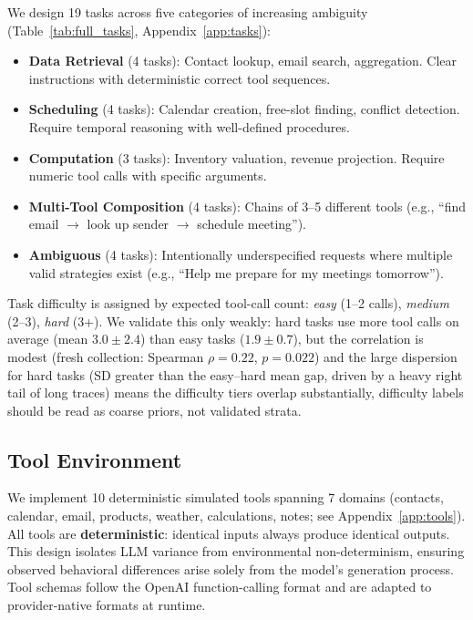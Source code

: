\documentclass[11pt]{article}
\begin{document}
We design 19 tasks across five categories of increasing ambiguity
(Table~\ref{tab:full_tasks}, Appendix~\ref{app:tasks}):

\begin{itemize}[leftmargin=1.5em]
  \item \textbf{Data Retrieval} (4 tasks): Contact lookup, email search, aggregation.
    Clear instructions with deterministic correct tool sequences.
  \item \textbf{Scheduling} (4 tasks): Calendar creation, free-slot finding, conflict
    detection. Require temporal reasoning with well-defined procedures.
  \item \textbf{Computation} (3 tasks): Inventory valuation, revenue projection.
    Require numeric tool calls with specific arguments.
  \item \textbf{Multi-Tool Composition} (4 tasks): Chains of 3--5 different tools
    (e.g., ``find email $\to$ look up sender $\to$ schedule meeting'').
  \item \textbf{Ambiguous} (4 tasks): Intentionally underspecified requests where
    multiple valid strategies exist
    (e.g., ``Help me prepare for my meetings tomorrow'').
\end{itemize}

\noindent
Task difficulty is assigned by expected tool-call count: \emph{easy} (1--2 calls),
\emph{medium} (2--3), \emph{hard} (3+). We validate this only weakly: hard tasks use more tool calls on average
(mean $3.0 \pm 2.4$) than easy tasks ($1.9 \pm 0.7$), but the correlation is
modest (fresh collection: Spearman $\rho = 0.22$, $p = 0.022$) and the large dispersion for
hard tasks (SD greater than the easy--hard mean gap, driven by a heavy right
tail of long traces) means the difficulty tiers overlap substantially,
difficulty labels should be read as coarse priors, not validated strata.

\subsection{Tool Environment}

We implement 10 deterministic simulated tools spanning 7 domains (contacts,
calendar, email, products, weather, calculations, notes; see
Appendix~\ref{app:tools}). All tools are \textbf{deterministic}: identical inputs
always produce identical outputs. This design isolates LLM variance from
environmental non-determinism, ensuring observed behavioral differences arise
solely from the model's generation process. Tool schemas follow the OpenAI
function-calling format and are adapted to provider-native formats at runtime.
\end{document}
